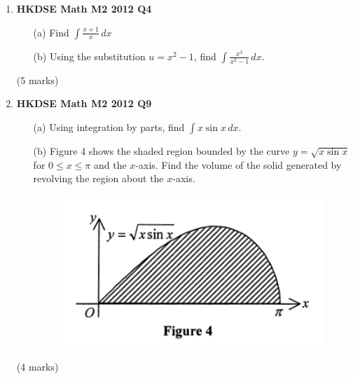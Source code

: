 \documentclass{report}
\begin{document}
\begin{enumerate}
	\item \textbf{HKDSE Math M2 2012 Q4}
	\begin{enumerate}
		\item [(a)]Find $\displaystyle\int \frac{x+1}{x}\,dx$
		\item [(b)]Using the substitution $u = x^2-1$, find $\displaystyle\int\frac{x^3}{x^2 - 1}\,dx$.
	\end{enumerate}
	(5 marks)

	\newpage

	\item \textbf{HKDSE Math M2 2012 Q9}
	\begin{enumerate}
		\item [(a)]Using integration by parts, find $\int x\sin{x}\,dx$. 
		\item [(b)]Figure 4 shows the shaded region bounded by the curve $y = \sqrt{x\sin{x}}$ for $0 \leq x \leq \pi$ and the $x$-axis. Find the volume of the solid generated by revolving the region about the $x$-axis.
	\begin{figure}[H]
		\centering
		\includegraphics[width = .5\linewidth]{2012Figure4}
	\end{figure}
	\end{enumerate}
	(4 marks)


\end{enumerate}
\end{document}
